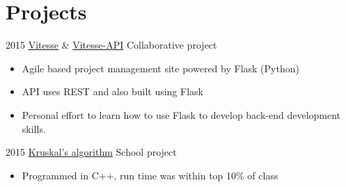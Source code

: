 \documentclass[letterpaper]{twentysecondcv} %
\begin{document}
\section{Projects}
\begin{twenty}
	\twentyitem
    	{ 2015}
        {\href{https://github.com/Gourave/Vitesse}{Vitesse} \& \href{https://github.com/Gourave/Vitesse_API}{Vitesse-API}}
        {Collaborative project}
        {}
        {
        {\begin{itemize}
        \item Agile based project management site powered by Flask (Python)
        \item API uses REST and also built using Flask
        \item Personal effort to learn how to use Flask to develop back-end development skills.
    \end{itemize}}
        }
        
    \twentyitem
    	{ 2015}
        {\href{https://github.com/davanB/School/blob/master/Weighted_graph.h}{Kruskal's algorithm}}
        {School project}
        {}
        {
        {\begin{itemize}
        \item Programmed in C++, run time was within top 10\% of class
    \end{itemize}}
        }
\end{twenty}
\end{document}
